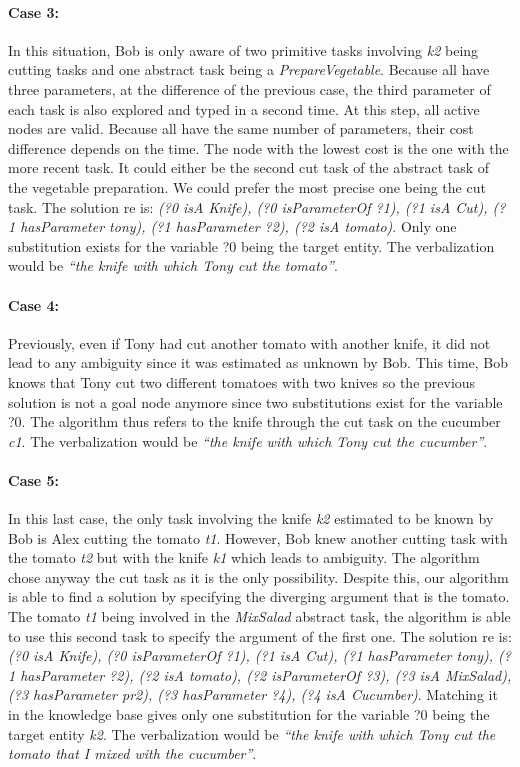 \paragraph{Case 3:} In this situation, Bob is only aware of two primitive tasks involving \textit{k2} being cutting tasks and one abstract task being a \textit{PrepareVegetable}. Because all have three parameters, at the difference of the previous case, the third parameter of each task is also explored and typed in a second time. At this step, all active nodes are valid. Because all have the same number of parameters, their cost difference depends on the time. The node with the lowest cost is the one with the more recent task. It could either be the second cut task of the abstract task of the vegetable preparation. We could prefer the most precise one being the cut task. The solution \acrshort{re} is: \textit{(?0 isA Knife), (?0 isParameterOf ?1), (?1 isA Cut), (?1 hasParameter tony), (?1 hasParameter ?2), (?2 isA tomato)}. Only one substitution exists for the variable ?0 being the target entity. The verbalization would be \textit{``the knife with which Tony cut the tomato''}.

\paragraph{Case 4:} Previously, even if Tony had cut another tomato with another knife, it did not lead to any ambiguity since it was estimated as unknown by Bob. This time, Bob knows that Tony cut two different tomatoes with two knives so the previous solution is not a goal node anymore since two substitutions exist for the variable ?0. The algorithm thus refers to the knife through the cut task on the cucumber \textit{c1}. The verbalization would be \textit{``the knife with which Tony cut the cucumber''}.

\paragraph{Case 5:} In this last case, the only task involving the knife \textit{k2} estimated to be known by Bob is Alex cutting the tomato \textit{t1}. However, Bob knew another cutting task with the tomato \textit{t2} but with the knife \textit{k1} which leads to ambiguity. The algorithm chose anyway the cut task as it is the only possibility. Despite this, our algorithm is able to find a solution by specifying the diverging argument that is the tomato. The tomato \textit{t1} being involved in the \textit{MixSalad} abstract task, the algorithm is able to use this second task to specify the argument of the first one. The solution \acrshort{re} is: \textit{(?0 isA Knife), (?0 isParameterOf ?1), (?1 isA Cut), (?1 hasParameter tony), (?1 hasParameter ?2), (?2 isA tomato), (?2 isParameterOf ?3), (?3 isA MixSalad), (?3 hasParameter pr2), (?3 hasParameter ?4), (?4 isA Cucumber)}. Matching it in the knowledge base gives only one substitution for the variable ?0 being the target entity \textit{k2}. The verbalization would be \textit{``the knife with which Tony cut the tomato that I mixed with the cucumber''}.


